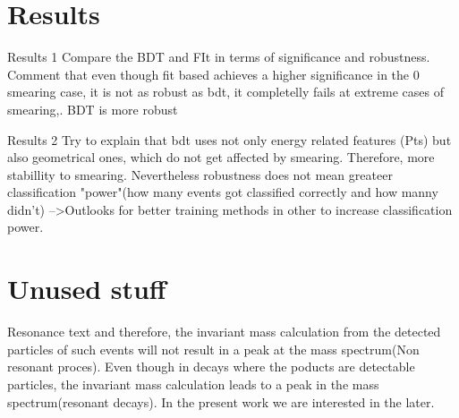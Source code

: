 \documentclass[bigger]{beamer}
\begin{document}
\section{Results}
\label{sec:org88575cc}
\begin{frame}[label={sec:org61b0e89}]{Results 1}
Compare the BDT and FIt in terms of significance and robustness. Comment that even though fit based achieves a higher significance in the 0 smearing case, it is not as robust as bdt, it completelly fails at extreme cases of smearing,. BDT is more robust 
\end{frame}
\begin{frame}[label={sec:org4ea3f1e}]{Results 2}
Try to explain that bdt uses not only energy related features (Pts) but also geometrical ones, which do not get affected by smearing. Therefore, more stabillity to smearing. Nevertheless robustness does not mean greateer classification "power"(how many events got classified correctly and how manny didn't) -->Outlooks for better training methods in other to increase classification power.   
\end{frame}
\section{Unused stuff}
\label{sec:org466d1d9}
\begin{frame}[label={sec:org026d1bb}]{Resonance text}
and therefore, the invariant mass calculation from the detected particles of such events will not result in a peak at the mass spectrum(Non resonant proces). Even though in decays where  the poducts are detectable particles, the invariant mass calculation leads to a peak in the mass spectrum(resonant decays). In the present work we are interested in the later.
\end{frame}
\end{document}
